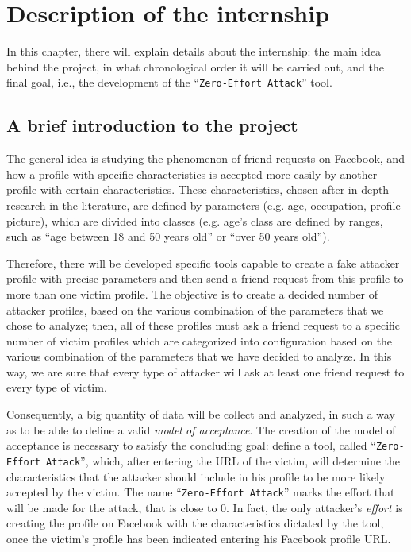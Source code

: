 
\chapter{Description of the internship}
\label{cap:description-internship}

In this chapter, there will explain details about the internship: the main idea behind the project, in what chronological order it will be carried out, and the final goal, i.e., the development of the ``\texttt{Zero-Effort Attack}'' tool. 

\section{A brief introduction to the project}
The general idea is studying the phenomenon of friend requests on Facebook, and how a profile with specific characteristics is accepted more easily by another profile with certain characteristics. These characteristics, chosen after in-depth research in the literature, are defined by parameters (e.g. age, occupation, profile picture), which are divided into classes (e.g. age's class are defined by ranges, such as ``age between 18 and 50 years old'' or ``over 50 years old'').
\par \noindent Therefore, there will be developed specific tools capable to create a fake attacker profile with precise parameters and then send a friend request from this profile to more than one victim profile. The objective is to create a decided number of attacker profiles, based on the various combination of the parameters that we chose to analyze; then, all of these profiles must ask a friend request to a specific number of victim profiles which are categorized into configuration based on the various combination of the parameters that we have decided to analyze. In this way, we are sure that every type of attacker will ask at least one friend request to every type of victim. 
\par \noindent Consequently, a big quantity of data will be collect and analyzed, in such a way as to be able to define a valid \emph{model of acceptance}. The creation of the model of acceptance is necessary to satisfy the concluding goal: define a tool, called ``\texttt{Zero-Effort Attack}'', which, after entering the URL of the victim, will determine the characteristics that the attacker should include in his profile to be more likely accepted by the victim. The name ``\texttt{Zero-Effort Attack}'' marks the effort that will be made for the attack, that is close to $0$. In fact, the only attacker's \emph{effort} is creating the profile on Facebook with the characteristics dictated by the tool, once the victim's profile has been indicated entering his Facebook profile URL.
